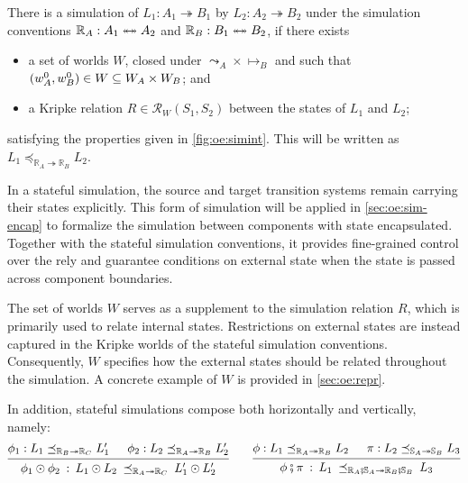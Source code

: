 \begin{definition}
  \label{def:oe:ssim}
  There is a simulation
  of $L_1 : A_1 \twoheadrightarrow B_1$
  by $L_2 : A_2 \twoheadrightarrow B_2$
  under the simulation conventions
  $\mathbb{R}_A : A_1 \twoheadleftarrow \mathrel{\mkern-15mu} \twoheadrightarrow A_2$ and
  $\mathbb{R}_B : B_1 \twoheadleftarrow \mathrel{\mkern-15mu} \twoheadrightarrow B_2$,
  if there exists
  \begin{itemize}
    \item a set of worlds $W$,
      closed under ${\leadsto_A} \times {\mapsto_B}$ and
      such that
      $(w^0_A, w^0_B) \in W \subseteq W_A \times W_B$;
      and
    \item
      a Kripke relation $R \in \mathcal{R}_W(S_1, S_2)$
      between the states of $L_1$ and $L_2$;
  \end{itemize}
  satisfying the properties given in
  \autoref{fig:oe:simint}.
  This will be written as
  $L_1 \preceq_{\mathbb{R}_A \twoheadrightarrow \mathbb{R}_B} L_2$.
\end{definition}

In a stateful simulation,
the source and target transition systems
remain carrying their states explicitly.
This form of simulation will be applied in \autoref{sec:oe:sim-encap}
to formalize the simulation between components with state encapsulated.
Together with the stateful simulation conventions,
it provides
fine-grained control over the rely and guarantee conditions
on external state when the state is passed across component boundaries.

The set of worlds $W$ serves as a supplement to
the simulation relation $R$,
which is primarily used
to relate internal states.
Restrictions on external states
are instead captured in the Kripke worlds
of the stateful simulation conventions.
Consequently, $W$ specifies
how the external states
should be related throughout the simulation.
A concrete example of $W$ is provided in \autoref{sec:oe:repr}.

In addition,
stateful simulations compose both horizontally and vertically,
namely:
\[
  \begin{prooftree}
    \hypo{
      \phi_1 :
      L_1
      \preceq_{\mathbb{R}_B \twoheadrightarrow \mathbb{R}_C}
    L_1'}
    \hypo{
      \phi_2 :
      L_2
      \preceq_{\mathbb{R}_A \twoheadrightarrow \mathbb{R}_B}
    L_2'}
    \infer2{
      \phi_1 \odot \phi_2 \::\:
      L_1 \odot L_2
      \: \preceq_{\mathbb{R}_A \twoheadrightarrow \mathbb{R}_C} \:
    L_1' \odot L_2'}
  \end{prooftree}
  \qquad
  \begin{prooftree}
    \hypo{\phi : L_1
      \preceq_{\mathbb{R}_A \twoheadrightarrow \mathbb{R}_B}
    L_2}
    \hypo{\pi : L_2
      \preceq_{\mathbb{S}_A \twoheadrightarrow \mathbb{S}_B}
    L_3}
    \infer2{
      \phi \mathbin\fatsemi \pi \::\:
      L_1 \:
      \preceq_{\mathbb{R}_A \mathbin\fatsemi \mathbb{S}_A \twoheadrightarrow
      \mathbb{R}_B \mathbin\fatsemi \mathbb{S}_B}
    \: L_3}
  \end{prooftree}
\]

